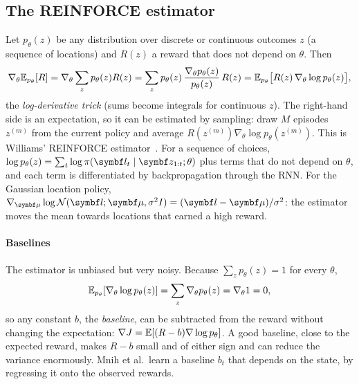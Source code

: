 \documentclass[11pt]{article}
\begin{document}
\subsection{The REINFORCE estimator}\label{sec:reinforce}

Let $p_\theta(z)$ be any distribution over discrete or continuous outcomes $z$ (a sequence of locations) and $R(z)$ a reward
that does not depend on $\theta$. Then
\begin{equation}\label{eq:reinforce}
  \nabla_\theta \mathbb{E}_{p_\theta}[R] = \nabla_\theta\sum_z p_\theta(z)R(z) = \sum_z p_\theta(z)\,\frac{\nabla_\theta p_\theta(z)}{p_\theta(z)}\,R(z)
  = \mathbb{E}_{p_\theta}\big[R(z)\,\nabla_\theta\log p_\theta(z)\big] ,
\end{equation}
the \emph{log-derivative trick} (sums become integrals for continuous $z$). The right-hand side is an expectation, so it can
be estimated by sampling: draw $M$ episodes $z^{(m)}$ from the current policy and average
$R(z^{(m)})\nabla_\theta\log p_\theta(z^{(m)})$. This is Williams' REINFORCE estimator~\cite{williams1992}. For a sequence of
choices, $\log p_\theta(z) = \sum_t \log\pi(\vect{l}_t \mid \vect{z}_{1:t}; \theta)$ plus terms that do not depend on
$\theta$, and each term is differentiated by backpropagation through the RNN. For the Gaussian location policy,
$\nabla_{\vect{\mu}}\log\Normal(\vect{l}; \vect{\mu}, \sigma^2 I) = (\vect{l} - \vect{\mu})/\sigma^2$: the estimator moves the mean
towards locations that earned a high reward.

\paragraph{Baselines} The estimator is unbiased but very noisy. Because $\sum_z p_\theta(z) = 1$ for every $\theta$,
\[
  \mathbb{E}_{p_\theta}[\nabla_\theta\log p_\theta(z)] = \sum_z \nabla_\theta p_\theta(z) = \nabla_\theta 1 = 0 ,
\]
so any constant $b$, the \emph{baseline}, can be subtracted from the reward without changing the expectation:
$\nabla J = \mathbb{E}[(R - b)\nabla\log p_\theta]$. A good baseline, close to the expected reward, makes $R - b$ small and of either
sign and can reduce the variance enormously. Mnih et al.\ learn a baseline $b_t$ that depends on the state, by regressing it
onto the observed rewards.
\end{document}
